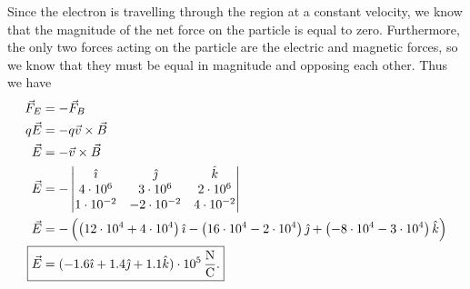 \documentclass{article}
\begin{document}
  Since the electron is travelling through the region at a constant velocity, we know that the magnitude of the net force on the particle is equal to zero. Furthermore, the only two forces acting on the particle are the electric and magnetic forces, so we know that they must be equal in magnitude and opposing each other. Thus we have
  \begin{align*}
    \vec{F}_E &= -\vec{F}_B \\
    q\vec{E} &= -q\vec{v}\times \vec{B} \\
    \vec{E} &= -\vec{v}\times \vec{B} \\
    \vec{E} &= -\begin{vmatrix}
      \hat{\imath} & \hat{\jmath} & \hat{k} \\
      4\cdot 10^6 & 3\cdot 10^6 & 2\cdot 10^6 \\
      1\cdot 10^{-2} & -2\cdot 10^{-2} & 4\cdot 10^{-2}
    \end{vmatrix} \\
    \vec{E} &= -\paren{\paren{12\cdot 10^4 + 4\cdot 10^4}\hat{\imath} - \paren{16\cdot 10^4 - 2\cdot 10^4}\hat{\jmath} + \paren{-8\cdot 10^4 - 3\cdot 10^4}\hat{k}} \\
    \Aboxed{\vec{E} &= (-1.6\hat{\imath} + 1.4\hat{\jmath} + 1.1\hat{k})\cdot 10^5 \,\frac{\mathrm{N}}{\mathrm{C}}.}
  \end{align*}
\end{document}
